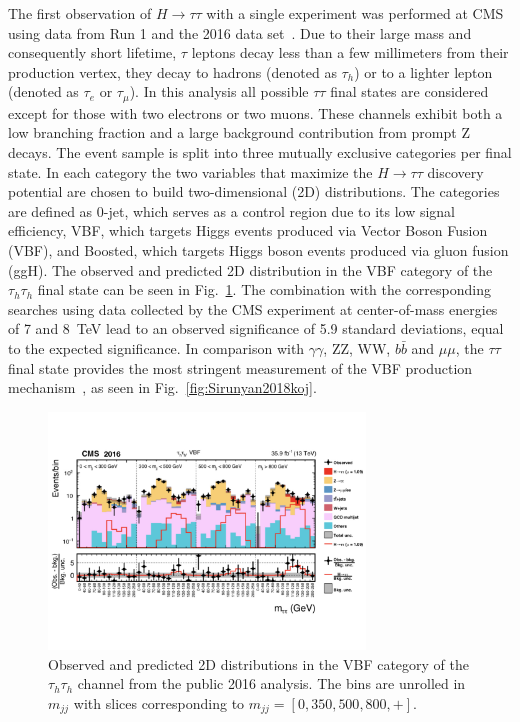 \documentclass[preprint,12pt]{elsarticle}
\begin{document}
The first observation of $H\rightarrow \tau \tau$ with a single experiment was performed 
at CMS using data from Run 1 and the 2016 data set~\cite{Aad:2015vsa}. 
Due to their large mass and consequently short lifetime, $\tau$ leptons decay less than a
few millimeters from their production vertex, they decay to hadrons (denoted as $\tau_{h}$)
or to a lighter lepton (denoted as $\tau_{e}$ or $\tau_{\mu}$).
In this analysis all possible $\tau\tau$ final states are considered except for those with
two electrons or two muons. These channels exhibit both a low 
branching fraction and a large background 
contribution from prompt Z decays. The event sample is split into three mutually 
exclusive categories
per final state. In each category the two variables that maximize the $H\rightarrow \tau \tau$ 
discovery potential are chosen to build two-dimensional (2D) distributions. The 
categories are defined as 0-jet, which serves as a control region due to its low signal
efficiency, VBF, which targets Higgs events produced via Vector Boson Fusion (VBF), and
Boosted, which targets Higgs boson events produced via gluon fusion (ggH). The observed and predicted 2D distribution
in the VBF category of the $\tau_{h}\tau_{h}$ final state can be seen in Fig.~\ref{fig:vbf_2016}.
The combination with the corresponding searches using data collected by the CMS experiment 
at center-of-mass energies of 7 and 8~TeV lead to an observed significance of 5.9 standard 
deviations, equal to the expected significance. In comparison with $\gamma\gamma$, ZZ, WW, 
$b\bar{b}$ and $\mu\mu$, the $\tau\tau$ final state provides the most stringent measurement of the VBF production mechanism~\cite{Sirunyan:2018koj}, as seen in Fig.~\ref{fig:Sirunyan2018koj}.
\begin{figure}[htbp]
\centering
     \includegraphics[trim=0 120 0 120,clip,width=0.75\textwidth]{HTT_Plots_2016.jpeg}
     \caption{Observed and predicted 2D distributions in the VBF category of the $\tau_{h}\tau_{h}$ channel from the public 2016 analysis. The bins are unrolled in $m_{jj}$ with slices corresponding to $m_{jj} = [0,350,500,800,+]$.}
     \label{fig:vbf_2016}
\end{figure}
\end{document}
